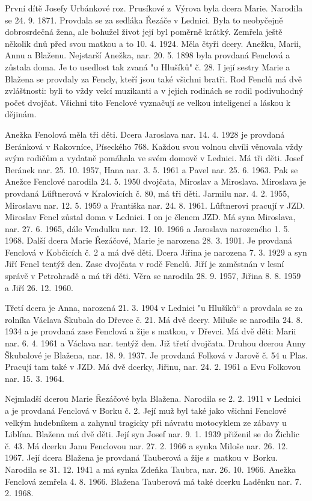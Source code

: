 \documentclass[../dejiny-rodu-prusiku.tex]{subfiles}
\begin{document}
První dítě Josefy Urbánkové roz. Prusíkové z Výrova byla dcera Marie. Narodila se 24. 9. 1871. Provdala se za sedláka Řezáče v Lednici. Byla to neobyčejně dobrosrdečná žena, ale bohužel život její byl poměrně krátký. Zemřela ještě několik dnů před svou matkou a to 10. 4. 1924. Měla čtyři dcery. Anežku, Marii, Annu a Blaženu. Nejstarší Anežka, nar. 20. 5. 1898 byla provdaná Fenclová a zůstala doma. Je to usedlost tak zvaná "u Hlušíků" č. 28. I její sestry Marie a Blažena se provdaly za Fencly, kteří jsou také všichni bratři. Rod Fenclů má dvě zvláštnosti: byli to vždy velcí muzikanti a v jejich rodinách se rodil podivuhodný počet dvojčat. Všichni tito Fenclové vyznačují se velkou inteligencí a láskou k dějinám.

Anežka Fenolová měla tři děti. Dcera Jaroslava nar. 14. 4. 1928 je provdaná Beránková v Rakovníce, Píseckého 768. Každou svou volnou chvíli věnovala vždy svým rodičům a vydatně pomáhala ve svém domově v Lednici. Má tři děti. Josef Beránek nar. 25. 10. 1957, Hana nar. 3. 5. 1961 a Pavel nar. 25. 6. 1963. Pak se Anežce Fenclové narodila 24. 5. 1950 dvojčata, Miroslav a Miroslava. Miroslava je provdaná Lűftnerová v Kralovicích č. 80, má tři děti. Jarmilu nar. 4. 2. 1955, Miroslavu nar. 12. 5. 1959 a Františka nar. 24. 8. 1961. Lűftnerovi pracují v JZD. Miroslav Fencl zůstal doma v Lednici. I on je členem JZD. Má syna Miroslava, nar. 27. 6. 1965, dále Vendulku nar. 12. 10. 1966 a Jaroslava narozeného 1. 5. 1968.  Další dcera Marie Řezáčové, Marie je narozena 28. 3. 1901. Je provdaná Fenclová v Kobčicích č. 2 a má dvě děti. Dcera Jiřina je narozena 7. 3. 1929 a syn Jiří Fencl tentýž den. Zase dvojčata v rodě Fenclů. Jiří je zaměstnán v les­ní správě v Petrohradě a má tři děti. Věra se narodila 28. 9. 1957, Jiřina 8. 8. 1959 a Jiří 26. 12. 1960.

Třetí dcera je Anna, narozená 21. 3. 1904 v Lednici "u Hlušíků“ a provdala se za rolníka Václava Škubala do Dřevce č. 21. Má dvě dcery. Miluše se narodila 24. 8. 1934 a je provdaná zase Fenclová a žije s matkou, v Dřevci. Má dvě děti: Marii nar. 6. 4. 1961 a Václava nar. tentýž den. Již třetí dvojčata. Druhou dcerou Anny Škubalové je Blažena, nar. 18. 9. 1937. Je provdaná Folková v Jarově č. 54 u Plas. Pracují tam také v JZD. Má dvě dcerky, Jiřinu, nar. 24. 2. 1961 a Evu Folkovou nar. 15. 3. 1964.

Nejmladší dcerou Marie Řezáčové byla Blažena. Narodila se 2. 2. 1911 v Lednici a je provdaná Fenclová v Borku č. 2. Její muž byl také jako všichni Fenclové velkým hudebníkem a zahynul tragicky při návratu motocyklem ze zábavy u Liblína. Blažena má dvě děti. Její syn Josef nar. 9. 1. 1939 přiženil se do Žichlic č. 43. Má dcerku Janu Fenclovou nar. 27. 2. 1966 a synka Miloše nar. 26. 12. 1967. Její dcera Blažena je provdaná Tauberová a žije s matkou v Borku. Narodila se 31. 12. 1941 a má synka Zdeňka Taubra, nar. 26. 10. 1966. Anežka Fenclová zemřela 4. 8. 1966. Blažena Tauberová má také dcerku Laděnku nar. 7. 2. 1968.
\end{document}
